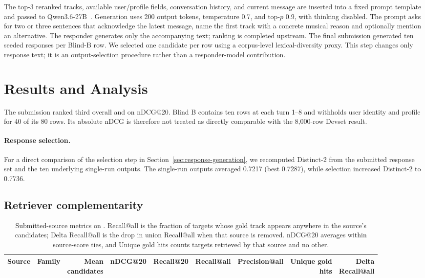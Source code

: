 \documentclass[sigconf]{acmart}
\begin{document}
The top-3 reranked tracks, available user/profile fields, conversation
history, and current message are inserted into a fixed prompt template and
passed to Qwen3.6-27B~\cite{qwen36model}.  Generation uses 200 output tokens,
temperature 0.7, and top-$p$ 0.9, with thinking disabled.  The prompt asks for
two or three sentences that acknowledge the latest message, name the first
track with a concrete musical reason and optionally mention an alternative.
The responder generates only the accompanying text; ranking is completed
upstream.  The final submission generated ten seeded responses per Blind-B row.
We selected one candidate per row using a corpus-level lexical-diversity proxy.
This step changes only response text; it is an output-selection procedure rather
than a responder-model contribution.

\section{Results and Analysis}
\LocalPreviewNotice
The submission ranked third overall and on nDCG@20.  Blind B contains ten rows
at each turn 1--8
and withholds user identity and profile for 40 of its 80 rows.  Its absolute
nDCG is therefore not treated as directly comparable with the 8,000-row
Devset result.

\paragraph{Response selection.}
For a direct comparison of the selection step in
Section~\ref{sec:response-generation}, we recomputed Distinct-2 from the
submitted response set and the ten underlying single-run outputs.  The
single-run outputs averaged 0.7217 (best 0.7287), while selection increased
Distinct-2 to 0.7736.

\subsection{Retriever complementarity}
\begin{table}[t]
  \caption{Submitted-source metrics on \LocalEvaluationName. Recall@all is the
  fraction of targets whose gold track appears anywhere in the source's
  candidates; Delta Recall@all is the drop in union Recall@all when that source
  is removed. nDCG@20 averages within source-score ties, and Unique gold hits
  counts targets retrieved by that source and no other.}
  \label{tab:retrievers}
  \centering
  \scriptsize
  \setlength{\tabcolsep}{2.3pt}
  \begin{tabular}{@{}llrrrrrrr@{}}
    \toprule
    Source & Family & \shortstack{Mean\\candidates} & nDCG@20 &
    Recall@20 & Recall@all & Precision@all & \shortstack{Unique gold\\hits} &
    \shortstack{Delta\\Recall@all} \\
    \midrule
    
  \end{tabular}
\end{table}
\end{document}
